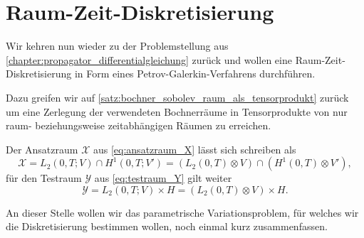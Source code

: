 
\section{Raum-Zeit-Diskretisierung} %
\label{sub:raum_zeit_diskretisierung}

Wir kehren nun wieder zu der Problemstellung aus \cref{chapter:propagator_differentialgleichung} zurück und wollen eine Raum-Zeit-Diskretisierung in Form eines Petrov-Galerkin-Verfahrens durchführen.

Dazu greifen wir auf \cref{satz:bochner_sobolev_raum_als_tensorprodukt} zurück um eine Zerlegung der verwendeten Bochnerräume in Tensorprodukte von nur raum- beziehungsweise zeitabhängigen Räumen zu erreichen.

\begin{Korollar}
    Der Ansatzraum $\mathcal X$ aus \cref{eq:ansatzraum_X} lässt sich schreiben als
    \begin{equation}
        \label{eq:gal:ansatzraum_tensor}
        \mathcal X = L_{2}(0, T; V) \cap H^{1}(0, T; V')
            = (L_2(0, T) \otimes V) \cap (H^{1}(0, T) \otimes V'),
    \end{equation}
    für den Testraum $\mathcal Y$ aus \cref{eq:testraum_Y} gilt weiter
    \begin{equation}
        \label{eq:gal:testraum_tensor}
        \mathcal Y = L_{2}(0, T; V) \times H = (L_{2}(0, T) \otimes V) \times H.
    \end{equation}
\end{Korollar}

An dieser Stelle wollen wir das parametrische Variationsproblem, für welches wir die Diskretisierung bestimmen wollen, noch einmal kurz zusammenfassen.

\begin{Bemerkung}
\end{Bemerkung}

